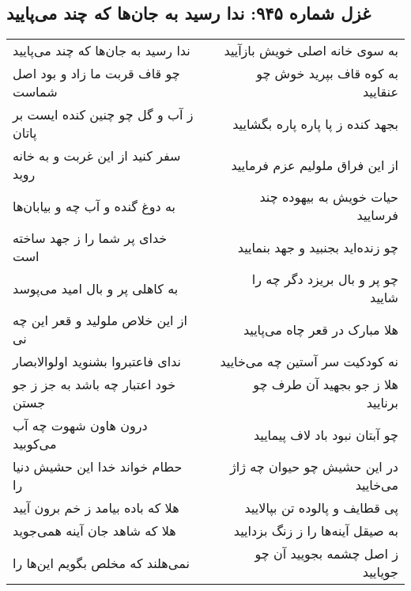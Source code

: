 \begin{center}
\section*{غزل شماره ۹۴۵: ندا رسید به جان‌ها که چند می‌پایید}
\label{sec:0945}
\begin{longtable}{l p{0.5cm} r}
ندا رسید به جان‌ها که چند می‌پایید
&&
به سوی خانه اصلی خویش بازآیید
\\
چو قاف قربت ما زاد و بود اصل شماست
&&
به کوه قاف بپرید خوش چو عنقایید
\\
ز آب و گل چو چنین کنده ایست بر پاتان
&&
بجهد کنده ز پا پاره پاره بگشایید
\\
سفر کنید از این غربت و به خانه روید
&&
از این فراق ملولیم عزم فرمایید
\\
به دوغ گنده و آب چه و بیابان‌ها
&&
حیات خویش به بیهوده چند فرسایید
\\
خدای پر شما را ز جهد ساخته است
&&
چو زنده‌اید بجنبید و جهد بنمایید
\\
به کاهلی پر و بال امید می‌پوسد
&&
چو پر و بال بریزد دگر چه را شایید
\\
از این خلاص ملولید و قعر این چه نی
&&
هلا مبارک در قعر چاه می‌پایید
\\
ندای فاعتبروا بشنوید اولوالابصار
&&
نه کودکیت سر آستین چه می‌خایید
\\
خود اعتبار چه باشد به جز ز جو جستن
&&
هلا ز جو بجهید آن طرف چو برنایید
\\
درون هاون شهوت چه آب می‌کوبید
&&
چو آبتان نبود باد لاف پیمایید
\\
حطام خواند خدا این حشیش دنیا را
&&
در این حشیش چو حیوان چه ژاژ می‌خایید
\\
هلا که باده بیامد ز خم برون آیید
&&
پی قطایف و پالوده تن بپالایید
\\
هلا که شاهد جان آینه همی‌جوید
&&
به صیقل آینه‌ها را ز زنگ بزدایید
\\
نمی‌هلند که مخلص بگویم این‌ها را
&&
ز اصل چشمه بجویید آن چو جویایید
\\
\end{longtable}
\end{center}
